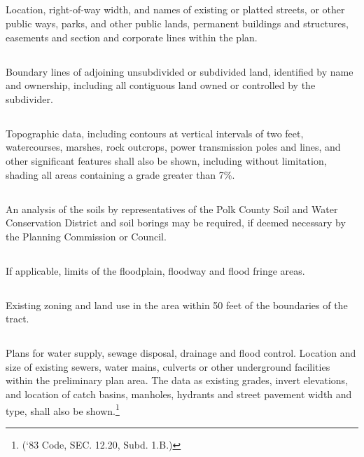 \subsection{}
Location, right-of-way width, and names of existing or platted streets, or other public ways, parks, and other public lands, permanent buildings and structures, easements and section and corporate lines within the plan.
\subsection{}
Boundary lines of adjoining unsubdivided or subdivided land, identified by name and ownership, including all contiguous land owned or controlled by the subdivider.
\subsection{}
Topographic data, including contours at vertical intervals of two feet, watercourses, marshes, rock outcrops, power transmission poles and lines, and other significant features shall also be shown, including without limitation, shading all areas containing a grade greater than 7\%.
\subsection{}
An analysis of the soils by representatives of the Polk County Soil and Water Conservation District and soil borings may be required, if deemed necessary by the Planning Commission or Council.
\subsection{}
If applicable, limits of the floodplain, floodway and flood fringe areas.
\subsection{}
Existing zoning and land use in the area within 50 feet of the boundaries of the tract.
\subsection{}
Plans for water supply, sewage disposal, drainage and flood control.  Location and size of existing sewers, water mains, culverts or other underground facilities within the preliminary plan area.  The data as existing grades, invert elevations, and location of catch basins, manholes, hydrants and street pavement width and type, shall also be shown.\footnote{(‘83 Code, SEC. 12.20, Subd. 1.B.)}
